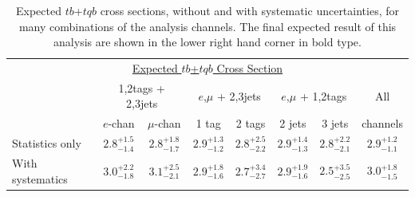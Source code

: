 \begin{table}[!h!tbp]
\begin{center}
\begin{minipage}{5in}
\begin{ruledtabular}
\begin{tabular}{l|cc|cc|cc|c}
  \multicolumn{8}{c}{\hspace{0.5in}\underline{Expected $tb$+$tqb$ Cross Section}}\vspace{0.1in}\\
& \multicolumn{2}{c|}{1,2tags + 2,3jets}& \multicolumn{2}{c|}{$e$,$\mu$ + 2,3jets}
& \multicolumn{2}{c|}{$e$,$\mu$ + 1,2tags}& All \\
                 &  $e$-chan & $\mu$-chan& 1 tag & 2 tags& 2 jets& 3 jets&channels\\
\hline
Statistics only  &  $2.8^{+1.5}_{-1.4}$  & $2.8^{+1.8}_{-1.7}$ & $2.9^{+1.3}_{-1.2}$ & $2.8^{+2.5}_{-2.2}$ & $2.9^{+1.4}_{-1.3}$ & $2.8^{+2.2}_{-2.1}$ & $2.9^{+1.2}_{-1.1}$ \\
With systematics &  $3.0^{+2.2}_{-1.8}$  & $3.1^{+2.5}_{-2.1}$ & $2.9^{+1.8}_{-1.6}$ & $2.7^{+3.4}_{-2.7}$ & $2.9^{+1.9}_{-1.6}$ & $2.5^{+3.5}_{-2.5}$ & $\mathbf{3.0^{+1.8}_{-1.5}}$ \\
\end{tabular}
\end{ruledtabular}
\vspace{-0.1in}
\caption[expxsecs]{Expected $tb$+$tqb$ cross sections, without and
with systematic uncertainties, for many combinations of the analysis
channels. The final expected result of this analysis are shown in the
lower right hand corner in bold type.}
\label{tab:expxsecs}
\end{minipage}
\end{center}
\end{table}


